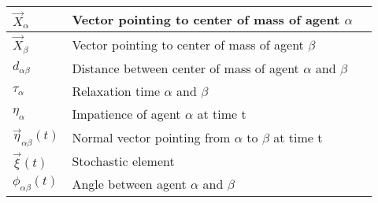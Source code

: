 \documentclass[12pt,a4paper]{report} %
\begin{document}
\begin{center}
\begin{tabular}{lll}
\hline
$\vec{X}_{\alpha}$ & Vector pointing to center of mass of agent $\alpha$ & \\
\hline
$\vec{X}_{\beta}$ & Vector pointing to center of mass of agent $\beta$ & \\
\hline
$d_{\alpha \beta}$ & Distance between center of mass of agent $\alpha$ and $\beta$ & \\
\hline
$\tau_{\alpha}$ & Relaxation time $\alpha$ and $\beta$ & \\
\hline
$\eta_{\alpha}$ & Impatience of agent $\alpha$ at time t & \\
\hline
$\vec{\eta}_{\alpha \beta}\left( t \right)$ & Normal vector pointing from $\alpha$ to $\beta$ at time t & \\
\hline
$\vec{\xi}\left( t \right)$ & Stochastic element & \\
\hline
$\phi_{\alpha \beta} \left( t \right)$ & Angle between agent $\alpha$ and $\beta$ & \\
\hline
\end{tabular}
\end{center}
\end{document}
